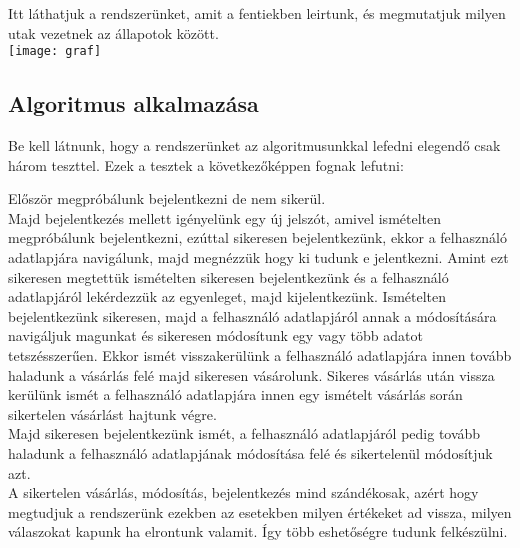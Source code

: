 \documentclass[12pt]{article}
\begin{document}
Itt láthatjuk a rendszerünket, amit a fentiekben leirtunk, és megmutatjuk milyen utak vezetnek az állapotok között.\\

\texttt{[image: graf]}

\subsection{Algoritmus alkalmazása}

Be kell látnunk, hogy a rendszerünket az algoritmusunkkal lefedni elegendő csak három teszttel.
Ezek a tesztek a következőképpen fognak lefutni:

Először megpróbálunk bejelentkezni de nem sikerül.\\
Majd bejelentkezés mellett igényelünk egy új jelszót, amivel ismételten megpróbálunk bejelentkezni, ezúttal sikeresen bejelentkezünk, ekkor a felhasználó adatlapjára navigálunk, majd megnézzük hogy ki tudunk e jelentkezni. Amint ezt sikeresen megtettük ismételten sikeresen bejelentkezünk és a felhasználó adatlapjáról lekérdezzük az egyenleget, majd kijelentkezünk. Ismételten bejelentkezünk sikeresen, majd a felhasználó adatlapjáról annak a módosítására navigáljuk magunkat és sikeresen módosítunk egy vagy több adatot tetszésszerűen. Ekkor ismét visszakerülünk a felhasználó adatlapjára innen tovább haladunk a vásárlás felé majd sikeresen vásárolunk. Sikeres vásárlás után vissza kerülünk ismét a felhasználó adatlapjára innen egy ismételt vásárlás során sikertelen vásárlást hajtunk végre.\\
Majd sikeresen bejelentkezünk ismét, a felhasználó adatlapjáról pedig tovább haladunk a felhasználó adatlapjának módosítása felé és sikertelenül módosítjuk azt.\\

A sikertelen vásárlás, módosítás, bejelentkezés mind szándékosak, azért hogy megtudjuk a rendszerünk ezekben az esetekben milyen értékeket ad vissza, milyen válaszokat kapunk ha elrontunk valamit. Így több eshetőségre tudunk felkészülni.\\
\end{document}
